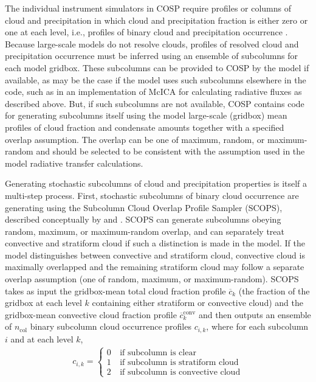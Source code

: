 The individual instrument simulators in COSP require profiles or columns
of cloud and precipitation in which cloud and precipitation fraction is
either zero or one at each level, i.e., profiles of binary cloud and
precipitation occurrence \citep{bodas-salcedo_et_al_2011}. Because
large-scale models do not resolve clouds, profiles of resolved cloud and
precipitation occurrence must be inferred using an ensemble of
subcolumns for each model gridbox. These subcolumns can be provided to
COSP by the model if available, as may be the case if the model uses
such subcolumns elsewhere in the code, such as in an implementation of
McICA for calculating radiative fluxes as described above. But, if such
subcolumns are not available, COSP contains code for generating
subcolumns itself using the model large-scale (gridbox) mean profiles of
cloud fraction and condensate amounts together with a specified overlap
assumption. The overlap can be one of maximum, random, or maximum-random
and should be selected to be consistent with the assumption used in the
model radiative transfer calculations.

Generating stochastic subcolumns of cloud and precipitation properties
is itself a multi-step process. First, stochastic subcolumns of binary
cloud occurrence are generating using the Subcolumn Cloud Overlap
Profile Sampler (SCOPS), described conceptually by
\citet{klein_and_jakob_1999} and \citet{webb_et_al_2001}. SCOPS can
generate subcolumns obeying random, maximum, or maximum-random overlap,
and can separately treat convective and stratiform cloud if such a
distinction is made in the model. If the model distinguishes between
convective and stratiform cloud, convective cloud is maximally
overlapped and the remaining stratiform cloud may follow a separate
overlap assumption (one of random, maximum, or maximum-random). SCOPS
takes as input the gridbox-mean total cloud fraction profile
\(\overline{c}_k\) (the fraction of the gridbox at each level \(k\)
containing either stratiform or convective cloud) and the gridbox-mean
convective cloud fraction profile \(\overline{c}^\textrm{conv}_k\) and
then outputs an ensemble of \(n_\textrm{col}\) binary subcolumn cloud
occurrence profiles \(c_{i, k}\), where for each subcolumn \(i\) and at
each level \(k\), \[\begin{gathered} 
    c_{i, k} = \begin{cases} 
        0 & ~\text{if subcolumn is clear} \\ 
        1 & ~\text{if subcolumn is stratiform cloud} \\ 
        2 & ~\text{if subcolumn is convective cloud} 
    \end{cases}
\end{gathered}\]

